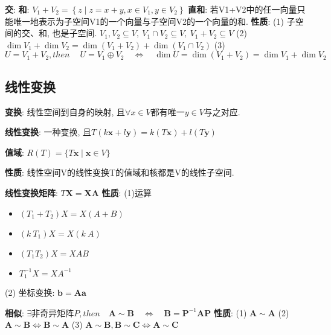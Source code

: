 \documentclass{article}
\begin{document}
        \textbf{交}: 
        \textbf{和}: $V_{1}+V_{2}=\left\{z \mid z=x+y, x \in V_{1}, y \in V_{2}\right\}$
        \textbf{直和}: 若V1+V2中的任一向量只能唯一地表示为子空间V1的一个向量与子空间V2的一个向量的和.
            \textbf{性质}: 
            (1) 子空间的交、和, 也是子空间. $V_1, V_2 \subseteq V,\ V_1 \cap V_2 \subseteq V,\ V_1 + V_2 \subseteq V$
            (2) $\operatorname{dim} V_{1}+\operatorname{dim} V_{2}=\operatorname{dim}\left(V_{1}+V_{2}\right)+\operatorname{dim}\left(V_{1} \cap V_{2}\right)$
            (3)  $U=V_{1} + V_{2}, then\ \quad U=V_{1} \oplus V_{2} \quad \Leftrightarrow \quad \operatorname{dim} U=\operatorname{dim}\left(V_{1}+V_{2}\right)=\operatorname{dim} V_{1}+\operatorname{dim} V_{2} $

        
    \subsection{线性变换}
        \textbf{变换}: 线性空间到自身的映射, 且$\forall x \in V$都有唯一$y \in V$与之对应.

        \textbf{线性变换}: 一种变换, 且$T(k \boldsymbol{x}+l \boldsymbol{y})=k(T \boldsymbol{x})+l(T \boldsymbol{y})$

        \textbf{值域}: $R(T)=\{T \boldsymbol{x} \mid \boldsymbol{x} \in V\}$

            \textbf{性质}: 线性空间V的线性变换T的值域和核都是V的线性子空间.

        \textbf{线性变换矩阵}: $T \boldsymbol X = \boldsymbol X \boldsymbol A$ 
            \textbf{性质}: 
            (1)运算
                \begin{itemize}
                    \item $(T_1 + T_2) X = X (A + B)$
                    \item $(k\ T_1) X = X (k\ A)$
                    \item $(T_1 T_2) X = X AB$
                    \item $T_1^{-1} X = X A^{-1}$
                \end{itemize}
            (2) 坐标变换: $\boldsymbol b = \boldsymbol A \boldsymbol a$

        \textbf{相似}: $\exists \text{非奇异矩阵}P, then \quad \boldsymbol A \sim \boldsymbol B \quad \Leftrightarrow \quad \boldsymbol B = \boldsymbol P^{-1} \boldsymbol A \boldsymbol P$
            \textbf{性质}: 
            (1) $\boldsymbol A \sim \boldsymbol A$ 
            (2) $\boldsymbol A \sim \boldsymbol B \Leftrightarrow \boldsymbol B \sim \boldsymbol A$ 
            (3) $\boldsymbol A \sim \boldsymbol B, \boldsymbol B \sim \boldsymbol C \Leftrightarrow \boldsymbol A \sim \boldsymbol C$
\end{document}
